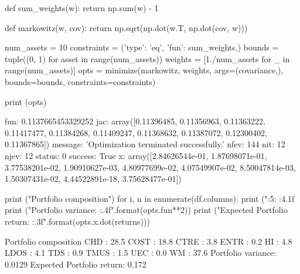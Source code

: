 \begin{solution}
\begin{ipython}
def sum_weights(w):
    return np.sum(w) - 1

def markowitz(w, cov):
    return np.sqrt(np.dot(w.T, np.dot(cov, w)))

num_assets = 10
constraints = ({'type': 'eq', 'fun': sum_weights},)
bounds = tuple((0, 1) for asset in range(num_assets))
weights = [1./num_assets for _ in range(num_assets)]
opts = minimize(markowitz, weights, args=(covariance,),
    bounds=bounds, constraints=constraints)

print (opts)
\end{ipython}
\begin{ioutput}
    fun: 0.1137665453329252
    jac: array([0.11396485, 0.11356963, 0.11363222, 0.11417477, 0.11384268,
                0.11409247, 0.11368632, 0.11387072, 0.12300402, 0.11367865])
message: 'Optimization terminated successfully.'
   nfev: 144
    nit: 12
   njev: 12
 status: 0
success: True
      x: array([2.84626544e-01, 1.87698071e-01, 3.77538201e-02, 
                1.90910627e-03, 4.80977699e-02, 4.07549907e-02, 
                8.50047814e-03, 1.50307431e-02, 4.44522891e-18, 
                3.75628477e-01])
\end{ioutput}
\begin{ipython}
print ("Portfolio composition")
for i, n in enumerate(df.columns):
    print ("{:5}: {:4.1f}%
print ("Portfolio variance: {:.4f}".format(opts.fun**2))
print ("Expected Portfolio return: {:.3f}".format(opts.x.dot(returns)))
\end{ipython}
\begin{ioutput}
Portfolio composition
CHD  : 28.5%
COST : 18.8%
CTRE : 3.8%
ENTR : 0.2%
HI   : 4.8%
LDOS : 4.1%
TDS  : 0.9%
TMUS : 1.5%
UEC  : 0.0%
WM   : 37.6%
Portfolio variance: 0.0129
Expected Portfolio return: 0.172
\end{ioutput}
\end{solution}

